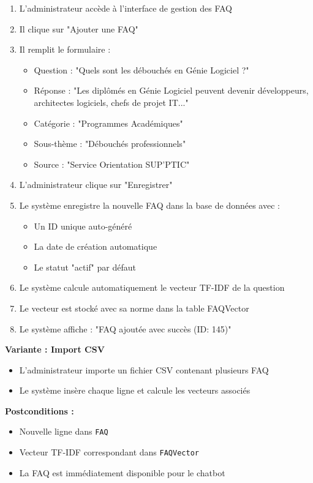 \documentclass[11pt,a4paper]{article}
\begin{document}
\begin{enumerate}
    \item L'administrateur accède à l'interface de gestion des FAQ
    \item Il clique sur "Ajouter une FAQ"
    \item Il remplit le formulaire :
    \begin{itemize}
        \item Question : "Quels sont les débouchés en Génie Logiciel ?"
        \item Réponse : "Les diplômés en Génie Logiciel peuvent devenir développeurs, architectes logiciels, chefs de projet IT..."
        \item Catégorie : "Programmes Académiques"
        \item Sous-thème : "Débouchés professionnels"
        \item Source : "Service Orientation SUP'PTIC"
    \end{itemize}
    \item L'administrateur clique sur "Enregistrer"
    \item Le système enregistre la nouvelle FAQ dans la base de données avec :
    \begin{itemize}
        \item Un ID unique auto-généré
        \item La date de création automatique
        \item Le statut "actif" par défaut
    \end{itemize}
    \item Le système calcule automatiquement le vecteur TF-IDF de la question
    \item Le vecteur est stocké avec sa norme dans la table FAQVector
    \item Le système affiche : "FAQ ajoutée avec succès (ID: 145)"
\end{enumerate}

\textbf{Variante : Import CSV} \begin{itemize} \item L'administrateur importe un fichier CSV contenant plusieurs FAQ \item Le système insère chaque ligne et calcule les vecteurs associés \end{itemize}

\textbf{Postconditions :}
\begin{itemize}
    \item Nouvelle ligne dans \texttt{FAQ}
    \item Vecteur TF-IDF correspondant dans \texttt{FAQVector}
    \item La FAQ est immédiatement disponible pour le chatbot
\end{itemize}
\end{document}
